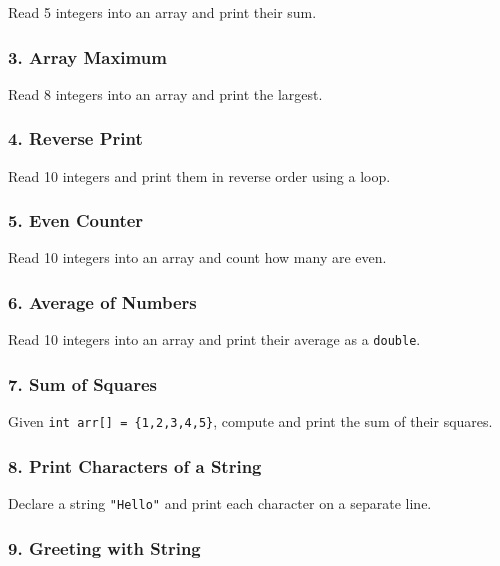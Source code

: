 \documentclass[
  letterpaper,
  DIV=11,
  numbers=noendperiod]{scrreprt}
\begin{document}
Read 5 integers into an array and print their sum.

\subsubsection{3. Array Maximum}\label{array-maximum}

Read 8 integers into an array and print the largest.

\subsubsection{4. Reverse Print}\label{reverse-print}

Read 10 integers and print them in reverse order using a loop.

\subsubsection{5. Even Counter}\label{even-counter}

Read 10 integers into an array and count how many are even.

\subsubsection{6. Average of Numbers}\label{average-of-numbers}

Read 10 integers into an array and print their average as a
\texttt{double}.

\subsubsection{7. Sum of Squares}\label{sum-of-squares}

Given \texttt{int\ arr{[}{]}\ =\ \{1,2,3,4,5\}}, compute and print the
sum of their squares.

\subsubsection{8. Print Characters of a
String}\label{print-characters-of-a-string}

Declare a string \texttt{"Hello"} and print each character on a separate
line.

\subsubsection{9. Greeting with String}\label{greeting-with-string}
\end{document}
